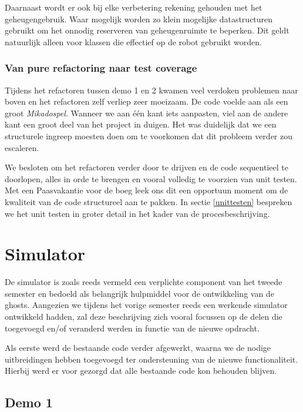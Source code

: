 \documentclass[12pt,a4paper]{report}
\begin{document}
Daarnaast wordt er ook bij elke verbetering rekening gehouden met het geheugengebruik. Waar mogelijk worden zo klein mogelijke datastructuren gebruikt om het onnodig reserveren van geheugenruimte te beperken. Dit geldt natuurlijk alleen voor klassen die effectief op de robot gebruikt worden.

\subsection{Van pure refactoring naar test coverage}

Tijdens het refactoren tussen demo 1 en 2 kwamen veel verdoken problemen naar boven en het refactoren zelf verliep zeer moeizaam. De code voelde aan als een groot \emph{Mikadospel}. Wanneer we aan \'e\'en kant iets aanpasten, viel aan de andere kant een groot deel van het project in duigen. Het was duidelijk dat we een structurele ingreep moesten doen om te voorkomen dat dit probleem verder zou escaleren.

We besloten om het refactoren verder door te drijven en de code sequentieel te doorlopen, alles in orde te brengen en vooral volledig te voorzien van unit testen. Met een Paasvakantie voor de boeg leek ons dit een opportuun moment om de kwaliteit van de code structureel aan te pakken.
In sectie \ref{unittesten} bespreken we het unit testen in groter detail in het kader van de procesbeschrijving.

\chapter{Simulator}

De simulator is zoals reeds vermeld een verplichte component van het tweede semester en bedoeld als belangrijk hulpmiddel voor de ontwikkeling van de ghosts. Aangezien we tijdens het vorige semester reeds een werkende simulator ontwikkeld hadden, zal deze beschrijving zich vooral focussen op de delen die toegevoegd en/of veranderd werden in functie van de nieuwe opdracht.

Als eerste werd de bestaande code verder afgewerkt, waarna we de nodige uitbreidingen hebben toegevoegd ter ondersteuning van de nieuwe functionaliteit. Hierbij werd er voor gezorgd dat alle bestaande code kon behouden blijven.

\section{Demo 1}
\end{document}
